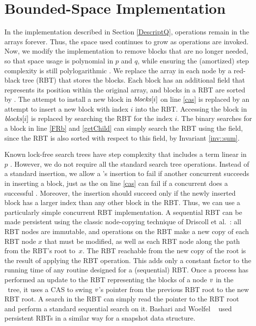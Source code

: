 
\section{Bounded-Space Implementation}
\label{reducing}

In the implementation described in Section \ref{DescriptQ}, 
operations remain in the  arrays forever. 
Thus, the space used continues to grow as operations are invoked.
Now, we modify the implementation to remove blocks that are no longer needed, so that space usage is
polynomial in $p$ and $q$, while ensuring the (amortized) step complexity is still polylogarithmic . We replace the  array in each node by a red-black tree (RBT)
that stores the blocks.
Each block has an additional  field
that represents its position within the original  array, and
blocks in a RBT are sorted by .
The attempt to install a new block in $\mbox{\textit{blocks}}[i]$  on line \ref{cas}
is replaced by an attempt to insert a new block with index $i$ into the RBT.
Accessing the block in $\mbox{\textit{blocks}}[i]$ is 
replaced by searching the RBT for the  index $i$.
The binary searches for a block in line \ref{FRb} and \ref{getChild} can simply search the RBT
using the  field, since the RBT is also sorted with respect to this field, by Invariant \ref{inv::sum}.
 
Known lock-free search trees have step complexity that includes a term linear in $p$ \cite{EFHR14,Ko20}.  
However, we do not require all the standard search tree operations.
Instead of a standard insertion, we allow a 's insertion to fail if another
concurrent  succeeds in inserting a block, just as the  on line \ref{cas}
can fail if a concurrent  does a successful .
Moreover, the insertion should succeed only if the newly inserted block has a larger index than any other block in the RBT.
Thus, we can use a particularly simple concurrent RBT implementation.
A sequential RBT can be made persistent using the classic node-copying technique of 
Driscoll et al.~\cite{DSST89}:  all RBT nodes are immutable, and operations on the 
RBT make a new copy of each RBT node $x$ that must be modified, as well
as each RBT node along the path from the RBT's root to~$x$.
The RBT reachable from the new copy of the root is the result of applying the RBT operation.
This  adds only a constant factor to the running time of any routine designed for a (sequential) RBT.
Once a process has performed an update to the RBT representing the blocks of a node 
$\mbox{\textnormal{\textit{v}}}$ in the \ordering\ tree, 
it uses a CAS to swing $\mbox{\textnormal{\textit{v}}}$'s pointer from the previous RBT root to the new RBT root.
A search in the RBT can simply read the pointer to the RBT root and perform a standard
sequential search on it.
Bashari and Woelfel ~\cite{DBLP:conf/podc/BashariW21} used persistent RBTs in a similar way for a snapshot data structure.

